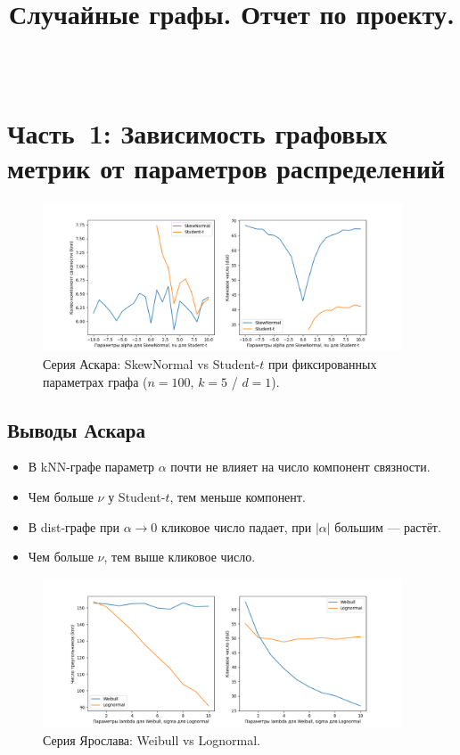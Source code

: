 \documentclass[a4paper,12pt]{article}
\author{~}
\date{}
\title{Случайные графы. Отчет по проекту.}
\begin{document}
\maketitle

\section*{Часть 1: Зависимость графовых метрик от параметров распределений}

\begin{figure}[H]
    \centering
    \includegraphics[width=0.95\textwidth]{part1_results_Askar.png}
    \caption{Серия Аскара: SkewNormal vs Student-$t$ при фиксированных параметрах графа ($n=100$, $k=5$ / $d=1$).}
    \label{fig:part1-askar}
\end{figure}

\subsection*{Выводы Аскара }
\begin{itemize}
    \item В kNN-графе параметр $\alpha$ почти не влияет на число компонент связности.
    \item Чем больше $\nu$ у Student-$t$, тем меньше компонент.
    \item В dist-графе при $\alpha\to0$ кликовое число падает, при $|\alpha|$ большим — растёт.
    \item Чем больше $\nu$, тем выше кликовое число.
\end{itemize}

\begin{figure}[H]
    \centering
    \includegraphics[width=0.95\textwidth]{part1_results_Yaroslav.png}
    \caption{Серия Ярослава: Weibull vs Lognormal.}
    \label{fig:part1-yaroslav}
\end{figure}
\end{document}

